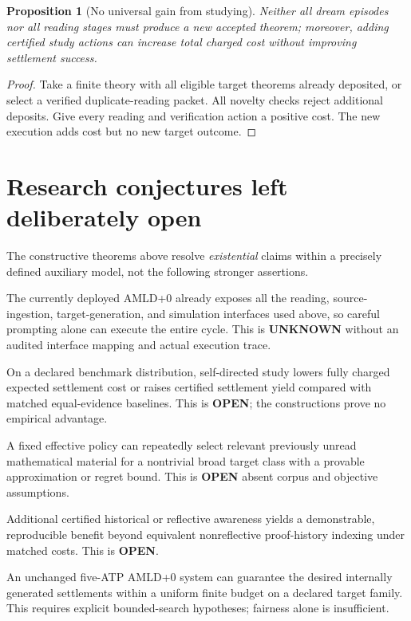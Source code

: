 \documentclass[11pt]{article}
\newtheorem{proposition}[theorem]{Proposition}
\begin{document}
\begin{proposition}[No universal gain from studying]
Neither all dream episodes nor all reading stages must produce a new accepted theorem; moreover, adding certified study actions can increase total charged cost without improving settlement success.
\end{proposition}
\begin{proof}Take a finite theory with all eligible target theorems already deposited, or select a verified duplicate-reading packet. All novelty checks reject additional deposits. Give every reading and verification action a positive cost. The new execution adds cost but no new target outcome.\end{proof}

\section{Research conjectures left deliberately open}
The constructive theorems above resolve \emph{existential} claims within a precisely defined auxiliary model, not the following stronger assertions.
\begin{description}[leftmargin=0.6cm,style=nextline]
\item[Conjecture A (Unmodified implementation).] The currently deployed AMLD+0 already exposes all the reading, source-ingestion, target-generation, and simulation interfaces used above, so careful prompting alone can execute the entire cycle. This is \textbf{UNKNOWN} without an audited interface mapping and actual execution trace.
\item[Conjecture B (Measured settlement improvement).] On a declared benchmark distribution, self-directed study lowers fully charged expected settlement cost or raises certified settlement yield compared with matched equal-evidence baselines. This is \textbf{OPEN}; the constructions prove no empirical advantage.
\item[Conjecture C (Useful curriculum selection).] A fixed effective policy can repeatedly select relevant previously unread mathematical material for a nontrivial broad target class with a provable approximation or regret bound. This is \textbf{OPEN} absent corpus and objective assumptions.
\item[Conjecture D (Reflection-derived search power).] Additional certified historical or reflective awareness yields a demonstrable, reproducible benefit beyond equivalent nonreflective proof-history indexing under matched costs. This is \textbf{OPEN}.
\item[Conjecture E (Finite-resource success).] An unchanged five-ATP AMLD+0 system can guarantee the desired internally generated settlements within a uniform finite budget on a declared target family. This requires explicit bounded-search hypotheses; fairness alone is insufficient.
\end{description}
\end{document}
